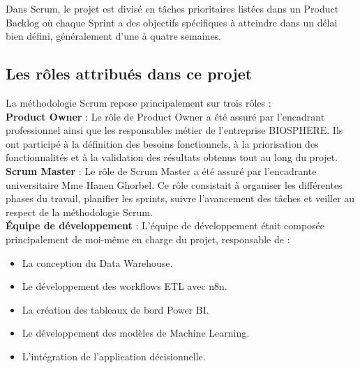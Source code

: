 Dans Scrum, le projet est divisé en tâches prioritaires listées dans un Product Backlog où chaque Sprint a des objectifs spécifiques à atteindre dans un délai bien défini, généralement d'une à quatre semaines.
\subsection{Les rôles attribués dans ce projet}
La méthodologie Scrum repose principalement sur trois rôles :\\
\textbf{Product Owner }: Le rôle de Product Owner a été assuré par l’encadrant professionnel ainsi que les responsables métier de l’entreprise BIOSPHERE. Ils ont participé à la définition des besoins fonctionnels, à la priorisation des fonctionnalités et à la validation des résultats obtenus tout au long du projet.\\
\textbf{Scrum Master} : Le rôle de Scrum Master a été assuré par l’encadrante universitaire Mme Hanen Ghorbel. Ce rôle consistait à organiser les différentes phases du travail, planifier les sprints, suivre l’avancement des tâches et veiller au respect de la méthodologie Scrum.\\
\textbf{Équipe de développement} : L’équipe de développement était composée principalement de moi-même en charge du projet, responsable de :
\begin{itemize}
    \item La conception du Data Warehouse. 
    \item Le développement des workflows ETL avec n8n. 
    \item La création des tableaux de bord Power BI. 
    \item Le développement des modèles de Machine Learning.
    \item L’intégration de l’application décisionnelle.
\end{itemize}


